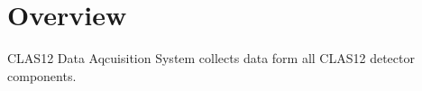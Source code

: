 \section{Overview}

CLAS12 Data Aqcuisition System collects data form all CLAS12 detector components.


